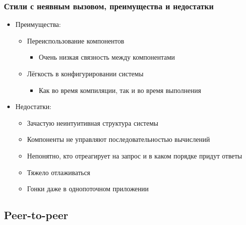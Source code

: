 \documentclass{../../slides-style}
\begin{document}
    \begin{frame}
        \frametitle{Стили с неявным вызовом, преимущества и недостатки}
        \begin{itemize}
            \item Преимущества:
            \begin{itemize}
                \item Переиспользование компонентов
                \begin{itemize}
                    \item Очень низкая связность между компонентами
                \end{itemize}
                \item Лёгкость в конфигурировании системы
                \begin{itemize}
                    \item Как во время компиляции, так и во время выполнения
                \end{itemize}
            \end{itemize}
            \item Недостатки:
            \begin{itemize}
                \item Зачастую неинтуитивная структура системы
                \item Компоненты не управляют последовательностью вычислений
                \item Непонятно, кто отреагирует на запрос и в каком порядке придут ответы
                \item Тяжело отлаживаться
                \item Гонки даже в однопоточном приложении
            \end{itemize}
        \end{itemize}
    \end{frame}

    \subsection{Peer-to-peer}
\end{document}
